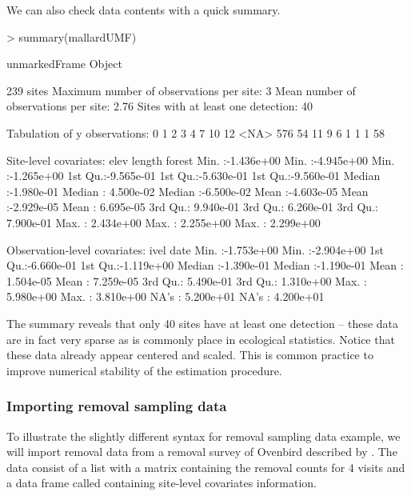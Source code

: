 \documentclass[article,shortnames]{jss}
\begin{document}
We can also check data contents with a quick summary.

\begin{Schunk}
\begin{Sinput}
> summary(mallardUMF)
\end{Sinput}
\begin{Soutput}
unmarkedFrame Object

239 sites
Maximum number of observations per site: 3 
Mean number of observations per site: 2.76 
Sites with at least one detection: 40 

Tabulation of y observations:
   0    1    2    3    4    7   10   12 <NA> 
 576   54   11    9    6    1    1    1   58 

Site-level covariates:
      elev                length               forest          
 Min.   :-1.436e+00   Min.   :-4.945e+00   Min.   :-1.265e+00  
 1st Qu.:-9.565e-01   1st Qu.:-5.630e-01   1st Qu.:-9.560e-01  
 Median :-1.980e-01   Median : 4.500e-02   Median :-6.500e-02  
 Mean   :-4.603e-05   Mean   :-2.929e-05   Mean   : 6.695e-05  
 3rd Qu.: 9.940e-01   3rd Qu.: 6.260e-01   3rd Qu.: 7.900e-01  
 Max.   : 2.434e+00   Max.   : 2.255e+00   Max.   : 2.299e+00  

Observation-level covariates:
      ivel                 date           
 Min.   :-1.753e+00   Min.   :-2.904e+00  
 1st Qu.:-6.660e-01   1st Qu.:-1.119e+00  
 Median :-1.390e-01   Median :-1.190e-01  
 Mean   : 1.504e-05   Mean   : 7.259e-05  
 3rd Qu.: 5.490e-01   3rd Qu.: 1.310e+00  
 Max.   : 5.980e+00   Max.   : 3.810e+00  
 NA's   : 5.200e+01   NA's   : 4.200e+01  
\end{Soutput}
\end{Schunk}

The summary reveals that only 40 sites have at least one detection --
these data are in fact very sparse as is commonly place in ecological statistics.
Notice that these data already appear centered and scaled.  This is
common practice to improve numerical stability of the estimation procedure.

\subsubsection{Importing removal sampling data}

To illustrate the slightly different syntax for removal sampling data
example, we will import removal data from a removal survey of Ovenbird 
described by \citet{Royle2004a}.  The data consist of a list with a
matrix  containing the removal counts for 4 visits and a
data frame called  containing site-level covariates
information.
\end{document}
